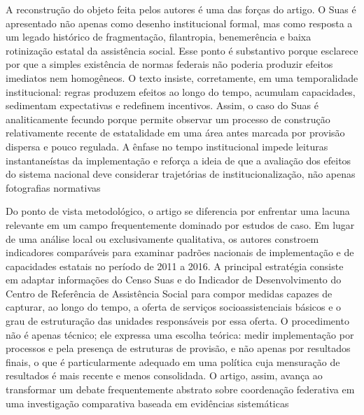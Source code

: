 \documentclass[12pt,a4paper]{article}
\begin{document}
A reconstrução do objeto feita pelos autores é uma das forças do artigo. O Suas é apresentado não apenas como desenho institucional formal, mas como resposta a um legado histórico de fragmentação, filantropia, benemerência e baixa rotinização estatal da assistência social. Esse ponto é substantivo porque esclarece por que a simples existência de normas federais não poderia produzir efeitos imediatos nem homogêneos. O texto insiste, corretamente, em uma temporalidade institucional: regras produzem efeitos ao longo do tempo, acumulam capacidades, sedimentam expectativas e redefinem incentivos. Assim, o caso do Suas é analiticamente fecundo porque permite observar um processo de construção relativamente recente de estatalidade em uma área antes marcada por provisão dispersa e pouco regulada. A ênfase no tempo institucional impede leituras instantaneístas da implementação e reforça a ideia de que a avaliação dos efeitos do sistema nacional deve considerar trajetórias de institucionalização, não apenas fotografias normativas\parencite{bichir2020_sistemas_nacionais}

Do ponto de vista metodológico, o artigo se diferencia por enfrentar uma lacuna relevante em um campo frequentemente dominado por estudos de caso. Em lugar de uma análise local ou exclusivamente qualitativa, os autores constroem indicadores comparáveis para examinar padrões nacionais de implementação e de capacidades estatais no período de 2011 a 2016. A principal estratégia consiste em adaptar informações do Censo Suas e do Indicador de Desenvolvimento do Centro de Referência de Assistência Social para compor medidas capazes de capturar, ao longo do tempo, a oferta de serviços socioassistenciais básicos e o grau de estruturação das unidades responsáveis por essa oferta. O procedimento não é apenas técnico; ele expressa uma escolha teórica: medir implementação por processos e pela presença de estruturas de provisão, e não apenas por resultados finais, o que é particularmente adequado em uma política cuja mensuração de resultados é mais recente e menos consolidada. O artigo, assim, avança ao transformar um debate frequentemente abstrato sobre coordenação federativa em uma investigação comparativa baseada em evidências sistemáticas\parencite{bichir2020_sistemas_nacionais}
\end{document}
